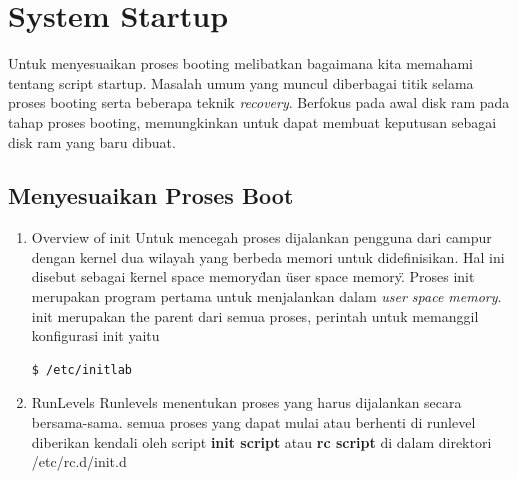 \section{System Startup}
Untuk menyesuaikan proses booting melibatkan bagaimana kita memahami tentang script startup. Masalah umum yang muncul diberbagai titik selama proses booting serta beberapa teknik \textit{recovery}. Berfokus pada awal disk ram pada tahap proses booting, memungkinkan untuk dapat membuat keputusan sebagai disk ram yang baru dibuat.
\subsection{Menyesuaikan Proses Boot}
\begin{enumerate}
\item Overview of init
Untuk mencegah proses dijalankan pengguna dari campur dengan kernel dua wilayah yang berbeda memori untuk didefinisikan. Hal ini disebut sebagai \" kernel space memory\" dan \"user space memory\". Proses init merupakan program pertama untuk menjalankan dalam \textit{user space memory}.
 init merupakan the parent dari semua proses, perintah untuk memanggil konfigurasi init yaitu 
\begin{verbatim}
$ /etc/initlab
\end{verbatim}
\item RunLevels
Runlevels menentukan proses yang harus dijalankan secara bersama-sama.  semua proses yang dapat mulai atau berhenti di runlevel diberikan kendali oleh script \textbf{init script} atau \textbf{rc script} di dalam direktori /etc/rc.d/init.d
\end{enumerate}